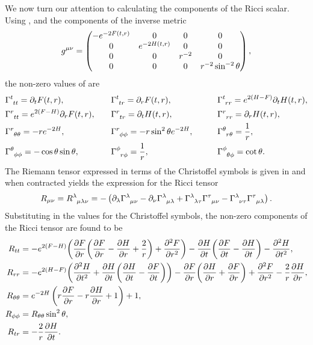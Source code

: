 We now turn our attention to calculating the components of the Ricci scalar. Using , and the components of the inverse metric
\begin{equation*}
	g^{\mu \nu} = \begin{pmatrix} -e^{-2F(t,r)} & 0 & 0 & 0 \\ 0 & e^{-2H(t,r)} & 0 & 0 \\ 0 & 0 & r^{-2} & 0 \\ 0 & 0 & 0 & r^{-2} \sin^{-2}\theta\end{pmatrix},
\end{equation*}
the non-zero values of  are
\begin{equation*}
   \begin{aligned}
    &\tensor{\Gamma}{^{t}_{tt}} = \partial_t F(t,r), \quad &&\tensor{\Gamma}{^{t}_{tr}} = \partial_r F(t,r) , \quad &&&&\tensor{\Gamma}{^{t}_{rr}} = e^{2(H-F)}\partial_t H(t,r) , \\
    &\tensor{\Gamma}{^{r}_{tt}} = e^{2(F-H)}\partial_r F(t,r)  ,\quad &&\tensor{\Gamma}{^{r}_{tr}} = \partial_t H(t,r) , \quad &&&&\tensor{\Gamma}{^{r}_{rr}} =  \partial_r H(t,r) , \\
    &\tensor{\Gamma}{^{r}_{\theta \theta}} = -re^{-2H} ,\quad &&\tensor{\Gamma}{^{r}_{\phi \phi}} = -r\sin^2\theta e^{-2H}, \quad &&&&\tensor{\Gamma}{^{\theta}_{r \theta}} = \frac{1}{r} ,\\
    &\tensor{\Gamma}{^{\theta}_{ \phi \phi}} = -\cos \theta \sin \theta ,\quad &&\tensor{\Gamma}{^{\phi}_{r \phi}} = \frac{1}{r} ,\quad &&&&\tensor{\Gamma}{^{\phi}_{\theta \phi}} = \cot \theta .\\
   \end{aligned}
\end{equation*}
The Riemann tensor expressed in terms of the Christoffel symbols is given in  and when contracted yields the expression for the Ricci tensor
\begin{equation}
\label{eq:ricchs}
   R_{\mu \nu} = \tensor{R}{^{\lambda}_{\mu \lambda \nu}} = -\left(\partial_\lambda \tensor{\Gamma}{^{\lambda}_{\mu \nu}} - \partial_\nu \tensor{\Gamma}{^{\lambda}_{\mu \lambda}} + \tensor{\Gamma}{^{\lambda}_{\lambda \tau}}\tensor{\Gamma}{^{\tau}_{\mu \nu}} - \tensor{\Gamma}{^{\lambda}_{\nu \tau}}\tensor{\Gamma}{^{\tau}_{\mu \lambda}} \right).
\end{equation}
 Substituting in the values for the Christoffel symbols, the non-zero components of the Ricci tensor are found to be
 \begin{equation}
   \begin{aligned}
   R_{tt} &= -e^{2(F-H)}\bigg(\frac{\partial F}{\partial r} \bigg( \frac{\partial F}{\partial r} - \frac{\partial H}{\partial r} +\frac{2}{r} \bigg) + \frac{\partial ^2 F}{\partial r^2} \bigg) - \frac{\partial H}{\partial t} \bigg( \frac{\partial F}{\partial t} - \frac{\partial H}{\partial t} \bigg) - \frac{\partial ^2 H}{\partial t^2}, \\  
   R_{rr} &= -e^{2(H-F)} \bigg(\frac{\partial ^2H}{\partial t^2} + \frac{\partial H}{\partial t}\bigg(\frac{\partial H}{\partial t}-\frac{\partial F}{\partial t} \bigg)\bigg) - \frac{\partial F}{\partial r} \bigg(\frac{\partial H}{\partial r} + \frac{\partial F}{\partial r} \bigg) + \frac{\partial ^2 F}{\partial r^2} - \frac{2}{r} \frac{\partial H}{\partial r} ,\\
   R_{\theta \theta} &= e^{-2H} \left( r\frac{\partial F}{\partial r} - r\frac{\partial H}{\partial r} + 1 \right) + 1 ,\\
   R_{\phi \phi} &= R_{\theta \theta} \sin^2\theta  ,\\
    R_{tr} &= - \frac{2}{r} \frac{\partial H}{\partial t}.
   \end{aligned}
\end{equation}
